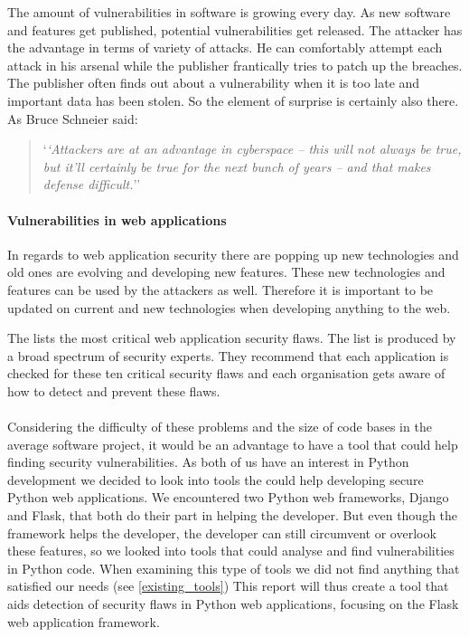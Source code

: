 The amount of vulnerabilities in software is growing every day.
As new software and features get published, potential vulnerabilities get released.
The attacker has the advantage in terms of variety of attacks.
He can comfortably attempt each attack in his arsenal while the publisher frantically tries to patch up the breaches.
The publisher often finds out about a vulnerability when it is too late and important data has been stolen.
So the element of surprise is certainly also there.
As Bruce Schneier said:
\begin{quote}
`\textit{`Attackers are at an advantage in cyberspace – this will not always be true, but it’ll certainly be true for the next bunch of years – and that makes defense difficult.}''\cite{schneier_interview}  
\end{quote}

\paragraph{Vulnerabilities in web applications}
In regards to web application security there are popping up new technologies and old ones are evolving and developing new features.
These new technologies and features can be used by the attackers as well.
Therefore it is important to be updated on current and new technologies when developing anything to the web.\cite{web_security_importance}

The \citet{OWASP10} lists the most critical web application security flaws.
The list is produced by a broad spectrum of security experts. 
They recommend that each application is checked for these ten critical security flaws and each organisation gets aware of how to detect and prevent these flaws.

\paragraph{}
Considering the difficulty of these problems and the size of code bases in the average software project, it would be an advantage to have a tool that could help finding security vulnerabilities.
As both of us have an interest in Python development we decided to look into tools the could help developing secure Python web applications.
We encountered two Python web frameworks, Django and Flask, that both do their part in helping the developer.
But even though the framework helps the developer, the developer can still circumvent or overlook these features, so we looked into tools that could analyse and find vulnerabilities in Python code.
When examining this type of tools we did not find anything that satisfied our needs (see \cref{existing_tools})
This report will thus create a tool that aids detection of security flaws in Python web applications, focusing on the Flask web application framework.
